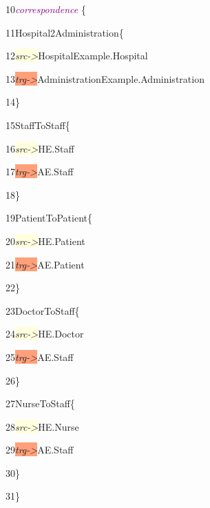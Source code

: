 {


10\hspace{0.5cm}\textcolor{Purple}{\textit{correspondence}} \{

11\hspace{1cm}Hospital2Administration\{

12\hspace{1.5cm}\colorbox{LightYellow}{\textit{src->}}HospitalExample.Hospital

13\hspace{1.5cm}\colorbox{LightSalmon}{\textit{trg->}}AdministrationExample.Administration

14\hspace{1cm}\}

15\hspace{1cm}StaffToStaff\{
	
16\hspace{1.5cm}\colorbox{LightYellow}{\textit{src->}}HE.Staff

17\hspace{1.5cm}\colorbox{LightSalmon}{\textit{trg->}}AE.Staff

18\hspace{1cm}\}

19\hspace{1cm}PatientToPatient\{

20\hspace{1.5cm}\colorbox{LightYellow}{\textit{src->}}HE.Patient

21\hspace{1.5cm}\colorbox{LightSalmon}{\textit{trg->}}AE.Patient

22\hspace{1cm}\}

23\hspace{1cm}DoctorToStaff\{

24\hspace{1.5cm}\colorbox{LightYellow}{\textit{src->}}HE.Doctor

25\hspace{1.5cm}\colorbox{LightSalmon}{\textit{trg->}}AE.Staff

26\hspace{1cm}\}

27\hspace{1cm}NurseToStaff\{

28\hspace{1.5cm}\colorbox{LightYellow}{\textit{src->}}HE.Nurse

29\hspace{1.5cm}\colorbox{LightSalmon}{\textit{trg->}}AE.Staff

30\hspace{1cm}\}

31\hspace{0.5cm}\}

}

